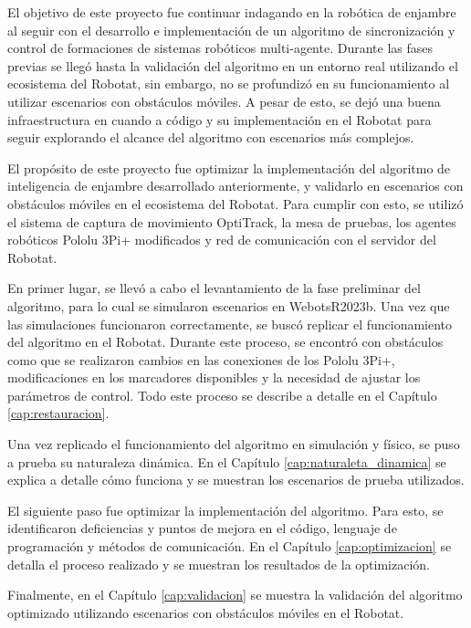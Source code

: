 El objetivo de este proyecto fue continuar indagando en la robótica de enjambre al seguir con el desarrollo e implementación de un algoritmo de sincronización y control de formaciones de sistemas robóticos multi-agente. Durante las fases previas se llegó hasta la validación del algoritmo en un entorno real utilizando el ecosistema del Robotat, sin embargo, no se profundizó en su funcionamiento al utilizar escenarios con obstáculos móviles. A pesar de esto, se dejó una buena infraestructura en cuando a código y su implementación en el Robotat para seguir explorando el alcance del algoritmo con escenarios más complejos.

El propósito de este proyecto fue optimizar la implementación del algoritmo de inteligencia de enjambre desarrollado anteriormente, y validarlo en escenarios con obstáculos móviles en el ecosistema del Robotat. Para cumplir con esto, se utilizó el sistema de captura de movimiento OptiTrack, la mesa de pruebas, los agentes robóticos Pololu 3Pi+ modificados y red de comunicación con el servidor del Robotat.

En primer lugar, se llevó a cabo el levantamiento de la fase preliminar del algoritmo, para lo cual se simularon escenarios en WebotsR2023b. Una vez que las simulaciones funcionaron correctamente, se buscó replicar el funcionamiento del algoritmo en el Robotat. Durante este proceso, se encontró con obstáculos como que se realizaron cambios en las conexiones de los Pololu 3Pi+, modificaciones en los marcadores disponibles y la necesidad de ajustar los parámetros de control. Todo este proceso se describe a detalle en el Capítulo \ref{cap:restauracion}.

Una vez replicado el funcionamiento del algoritmo en simulación y físico, se puso a prueba su naturaleza dinámica. En el Capítulo \ref{cap:naturaleta_dinamica} se explica a detalle cómo funciona y se muestran los escenarios de prueba utilizados.

El siguiente paso fue optimizar la implementación del algoritmo. Para esto, se identificaron deficiencias y puntos de mejora en el código, lenguaje de programación y métodos de comunicación. En el Capítulo \ref{cap:optimizacion} se detalla el proceso realizado y se muestran los resultados de la optimización.

Finalmente, en el Capítulo \ref{cap:validacion} se muestra la validación del algoritmo optimizado utilizando escenarios con obstáculos móviles en el Robotat.